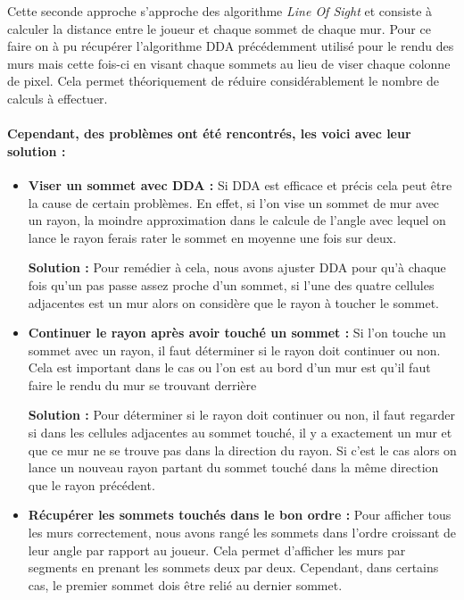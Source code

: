 \documentclass[11pt]{article}
\begin{document}
Cette seconde approche s'approche des algorithme \textit{Line Of Sight} et consiste à calculer la distance entre le 
joueur et chaque sommet de chaque mur.
Pour ce faire on à pu récupérer l'algorithme DDA précédemment utilisé pour le rendu des murs mais cette fois-ci 
en visant chaque sommets au lieu de viser chaque colonne de pixel. Cela permet théoriquement de réduire considérablement 
le nombre de calculs à effectuer.
\paragraph{Cependant, des problèmes ont été rencontrés, les voici avec leur solution :}
\begin{itemize}
	\item \textbf{Viser un sommet avec DDA : } Si DDA est efficace et précis cela peut être la cause de certain problèmes. 
	En effet, si l'on vise un sommet de mur avec un rayon, la moindre approximation dans le calcule de l'angle avec lequel on 
	lance le rayon ferais rater le sommet en moyenne une fois sur deux.

	\textbf{Solution : }Pour remédier à cela, nous avons ajuster DDA pour qu'à chaque fois qu'un pas
	passe assez proche d'un sommet, si l'une des quatre cellules adjacentes est
	un mur alors on considère que le rayon à toucher le sommet.

	\item \textbf{Continuer le rayon après avoir touché un sommet :} Si l'on touche un sommet avec 
	un rayon, il faut déterminer si le rayon doit continuer ou non. Cela est important dans le cas ou l'on 
	est au bord d'un mur est qu'il faut faire le rendu du mur se trouvant derrière

	\textbf{Solution : }Pour déterminer si le rayon doit continuer ou non, il faut regarder si
	dans les cellules adjacentes au sommet touché, il y a exactement un mur et que ce mur
	ne se trouve pas dans la direction du rayon. Si c'est le cas alors on lance un nouveau rayon 
	partant du sommet touché dans la même direction que le rayon précédent.

	\item \textbf{Récupérer les sommets touchés dans le bon ordre :} Pour afficher tous les murs correctement,
	nous avons rangé les sommets dans l'ordre croissant de leur angle par rapport au joueur. Cela permet d'afficher
	les murs par segments en prenant les sommets deux par deux. Cependant, dans certains cas, le premier sommet 
	dois être relié au dernier sommet.


\end{itemize}
\end{document}
